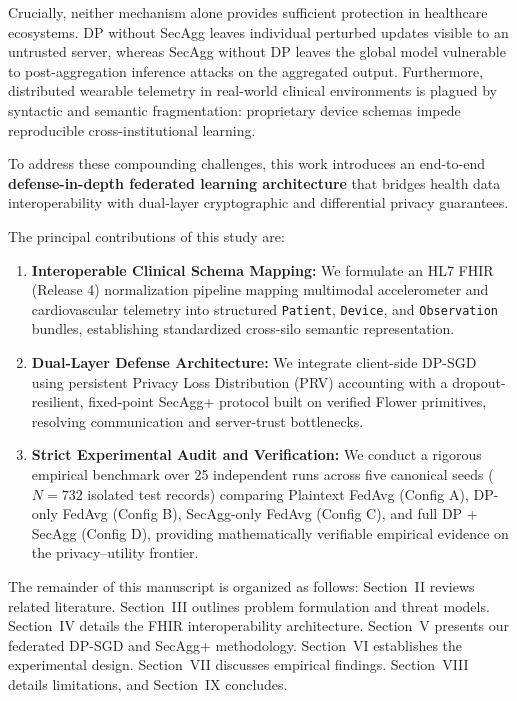 \documentclass[journal,twocolumn,10pt]{IEEEtran}
\begin{document}
Crucially, neither mechanism alone provides sufficient protection in healthcare ecosystems. DP without SecAgg leaves individual perturbed updates visible to an untrusted server, whereas SecAgg without DP leaves the global model vulnerable to post-aggregation inference attacks on the aggregated output. Furthermore, distributed wearable telemetry in real-world clinical environments is plagued by syntactic and semantic fragmentation: proprietary device schemas impede reproducible cross-institutional learning.

To address these compounding challenges, this work introduces an end-to-end \textbf{defense-in-depth federated learning architecture} that bridges health data interoperability with dual-layer cryptographic and differential privacy guarantees.

The principal contributions of this study are:
\begin{enumerate}
    \item \textbf{Interoperable Clinical Schema Mapping:} We formulate an HL7 FHIR (Release 4) normalization pipeline mapping multimodal accelerometer and cardiovascular telemetry into structured \texttt{Patient}, \texttt{Device}, and \texttt{Observation} bundles, establishing standardized cross-silo semantic representation.
    \item \textbf{Dual-Layer Defense Architecture:} We integrate client-side DP-SGD using persistent Privacy Loss Distribution (PRV) accounting with a dropout-resilient, fixed-point SecAgg+ protocol built on verified Flower primitives, resolving communication and server-trust bottlenecks.
    \item \textbf{Strict Experimental Audit and Verification:} We conduct a rigorous empirical benchmark over 25 independent runs across five canonical seeds ($N=732$ isolated test records) comparing Plaintext FedAvg (Config A), DP-only FedAvg (Config B), SecAgg-only FedAvg (Config C), and full DP + SecAgg (Config D), providing mathematically verifiable empirical evidence on the privacy--utility frontier.
\end{enumerate}

The remainder of this manuscript is organized as follows: Section~II reviews related literature. Section~III outlines problem formulation and threat models. Section~IV details the FHIR interoperability architecture. Section~V presents our federated DP-SGD and SecAgg+ methodology. Section~VI establishes the experimental design. Section~VII discusses empirical findings. Section~VIII details limitations, and Section~IX concludes.
\end{document}
